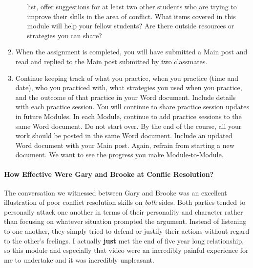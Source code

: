 \documentclass[stu,12pt]{apa7}
\begin{document}
\begin{enumerate}
\begin{itemize}
              list, offer suggestions for at least two other students who are
              trying to improve their skills in the area of conflict. What items
              covered in this module will help your fellow students? Are there
              outside resources or strategies you can share?
          \end{itemize}
        \item When the assignment is completed, you will have submitted a Main
          post and read and replied to the Main post  submitted by two
          classmates.
        \item Continue keeping track of what you practice, when you practice
          (time and date), who you practiced with, what strategies you used when
          you practice, and the outcome of that practice in your Word document.
          Include details with each practice session. You will continue to share
          practice session updates in future Modules. In each Module, continue
          to add practice sessions to the same Word document. Do not start over.
          By the end of the course, all your work should be posted in the same
          Word document. Include an updated Word document with your Main post.
          Again, refrain from starting a new document. We want to see the
          progress you make Module-to-Module.
      \end{enumerate}


    \newpage
    \paragraph{How Effective Were Gary and Brooke at Conflic Resolution?}
      The conversation we witnessed between Gary and Brooke was an excellent
        illustration of poor conflict resolution skills on \textit{both}
        sides. Both parties tended to personally attack one another in terms of
        their personality and character rather than focusing on whatever
        situation prompted the argument. Instead of listening to one-another,
        they simply tried to defend or justify their actions without regard
        to the other's feelings. I actually \textbf{just} met the end of five
        year long relationship, so this module and especially that video were
        an incredibly painful experience for me to undertake and it was
        incredibly unpleasant.
\end{document}
